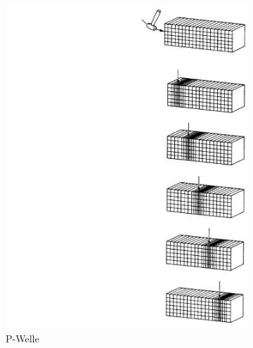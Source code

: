 \begin{figure}[H]
	\begin{subfigure}[m]{0.5\textwidth}
		\centering
		\includegraphics[scale = 0.3]{SeismikBilder/PWelle}
		\caption*{P-Welle}
	\end{subfigure}
	\begin{subfigure}[m]{0.5\textwidth}
		\centering

\end{subfigure}
\end{figure}

